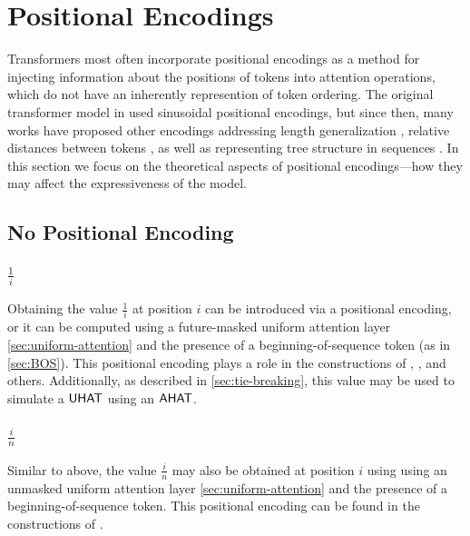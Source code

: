 %
\chapter{Positional Encodings}
%

Transformers most often incorporate positional encodings as a method for injecting information about the positions of tokens into attention operations, which do not have an inherently represention of token ordering. The original transformer model in \citet{vaswani-etal-2017-attention} used sinusoidal positional encodings, but since then, many works have proposed other encodings addressing length generalization \citep{kazemnejad2024impact}, relative distances between tokens \citep{shaw2018self}, as well as representing tree structure in sequences \citep{shiv2019}. In this section we focus on the theoretical aspects of positional encodings---how they may affect the expressiveness of the model.


\section{No Positional Encoding}

\subsection{$\frac{1}{i}$}

Obtaining the value $\frac{1}{i}$ at position $i$ can be introduced via a positional encoding, or it can be computed using a future-masked uniform attention layer \cref{sec:uniform-attention} and the presence of a beginning-of-sequence token (as in \cref{sec:BOS}). This positional encoding plays a role in the constructions of \citet{barcelo-etal-2024-logical}, \citet{merrill-sabharwal-2024-cot}, and others. Additionally, as described in \cref{sec:tie-breaking}, this value may be used to simulate a $\textsf{UHAT}$ using an $\textsf{AHAT}$.



\subsection{$\frac{i}{n}$}
Similar to above, the value $\frac{i}{n}$ may also be obtained at position $i$ using using an unmasked uniform attention layer \cref{sec:uniform-attention} and the presence of a beginning-of-sequence token. This positional encoding can be found in the constructions of \cite{merrill2023parallelism,chiang-cholak-2022-parity,strobl2024transformers}.

